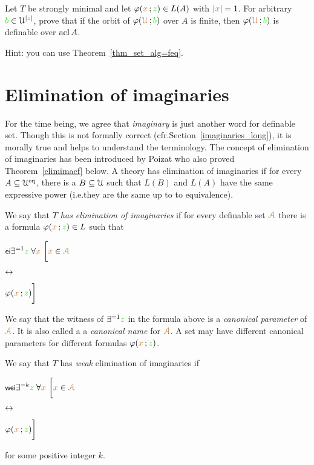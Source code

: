 \documentclass[creche.tex]{subfiles}
\begin{document}
\begin{exercise}
Let $T$ be strongly minimal and let $\varphi({\color{brown} x}\,;{\color{green} z})\in L(A)$ with $|{\color{brown} x}|=1$. For arbitrary ${\color{green} b}\in\EuScript U^{|{\color{green} z}|}$, prove that if the orbit of $\varphi({\color{brown}\EuScript U}\,; {\color{green} b})$ over $A$ is finite, then $\varphi({\color{brown}\EuScript U}\,; {\color{green} b})$ is definable over $\mathop{\rm acl} A$.

Hint: you can use Theorem~\ref{thm_set_alg=feq}.\QED
\end{exercise}








\section{Elimination of imaginaries}\label{elimination_imaginaries}

\def\medrel#1{\parbox[t]{5ex}{$\displaystyle\hfil #1$}}
\def\ceq#1#2#3{\parbox[t]{30ex}{$\displaystyle #1$}\medrel{#2}{$\displaystyle #3$}}

For the time being, we agree that \textit{imaginary\/} is just another word for definable set. Though this is not formally correct (cfr.\@ Section~\ref{imaginaries_long}), it is morally true and helps to understand the terminology. The concept of elimination of imaginaries has been introduced by Poizat who also proved Theorem~\ref{elimimacf} below. A theory has elimination of imaginaries if for every $A\subseteq\EuScript U^{{\rm eq}}$, there is a $B\subseteq\EuScript U$ such that $L(B)$ and $L(A)$ have the same expressive power (i.e.\@ they are the same up to to equivalence).  

\begin{definition}\label{defelimanazioneimmaginari}
We say that \emph{$T$ has elimination of imaginaries\/} if for every definable set ${\color{brown}\EuScript A}$ there is a formula $\varphi({\color{brown} x}\,;{\color{green} z})\in L$ such that\smallskip

\ceq{\ssf{ei}\hfill\E^{=1} {\gr z}\;\A {\mr x}\ \bigg[{\mr x}\in{\vl\Aa}}{\iff}{\phi({\mr x}\,;{\gr z})\bigg]}

We say that the witness of $\exists^{=1}{\color{green} z}$ in the formula above is a \emph{canonical parameter\/} of ${\color{brown}\EuScript A}$. It is also called a a \emph{canonical name\/} for ${\color{brown}\EuScript A}$. A set may have different canonical parameters for different formulas $\varphi({\color{brown} x}\,;{\color{green} z})$.

We say that $T$ has \emph{weak\/} elimination of imaginaries if\smallskip

\ceq{\ssf{wei}\hfill\E^{=k} {\gr z}\;\A {\mr x}\ \bigg[{\mr x}\in{\vl\Aa}}{\iff}{\phi({\mr x}\,;{\gr z})\bigg]}

for some positive integer $k$.\QED
\end{definition}
\end{document}
